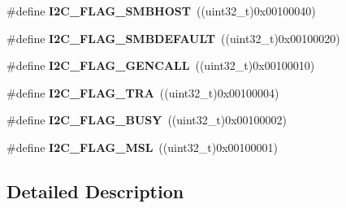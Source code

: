 \begin{DoxyCompactItemize}
\item 
\#define {\bfseries I2\+C\+\_\+\+F\+L\+A\+G\+\_\+\+S\+M\+B\+H\+O\+ST}~((uint32\+\_\+t)0x00100040)\hypertarget{group___i2_c___flag__definition_gaf15403a1852f39aaadbb8942ba98d97e}{}\label{group___i2_c___flag__definition_gaf15403a1852f39aaadbb8942ba98d97e}

\item 
\#define {\bfseries I2\+C\+\_\+\+F\+L\+A\+G\+\_\+\+S\+M\+B\+D\+E\+F\+A\+U\+LT}~((uint32\+\_\+t)0x00100020)\hypertarget{group___i2_c___flag__definition_ga371fb29861d1cd41736253e804c67ad5}{}\label{group___i2_c___flag__definition_ga371fb29861d1cd41736253e804c67ad5}

\item 
\#define {\bfseries I2\+C\+\_\+\+F\+L\+A\+G\+\_\+\+G\+E\+N\+C\+A\+LL}~((uint32\+\_\+t)0x00100010)\hypertarget{group___i2_c___flag__definition_gab3a93b6840ad406c2fc09e0e96c59b88}{}\label{group___i2_c___flag__definition_gab3a93b6840ad406c2fc09e0e96c59b88}

\item 
\#define {\bfseries I2\+C\+\_\+\+F\+L\+A\+G\+\_\+\+T\+RA}~((uint32\+\_\+t)0x00100004)\hypertarget{group___i2_c___flag__definition_ga0359a5f960670d51cb17e659d32498ea}{}\label{group___i2_c___flag__definition_ga0359a5f960670d51cb17e659d32498ea}

\item 
\#define {\bfseries I2\+C\+\_\+\+F\+L\+A\+G\+\_\+\+B\+U\+SY}~((uint32\+\_\+t)0x00100002)\hypertarget{group___i2_c___flag__definition_ga50f69f043d99600221076100823b6ff3}{}\label{group___i2_c___flag__definition_ga50f69f043d99600221076100823b6ff3}

\item 
\#define {\bfseries I2\+C\+\_\+\+F\+L\+A\+G\+\_\+\+M\+SL}~((uint32\+\_\+t)0x00100001)\hypertarget{group___i2_c___flag__definition_gae8e6a404cbfd70420d278d520304f368}{}\label{group___i2_c___flag__definition_gae8e6a404cbfd70420d278d520304f368}

\end{DoxyCompactItemize}


\subsection{Detailed Description}
